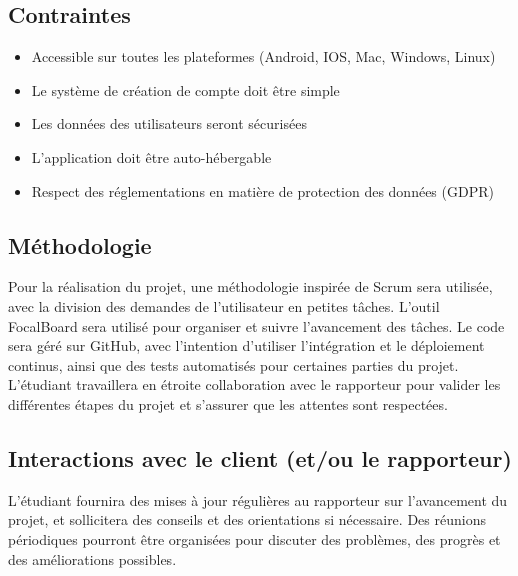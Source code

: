 \subsection{Contraintes}\label{subsec:contraintes}
\begin{itemize}
    \item Accessible sur toutes les plateformes (Android, IOS, Mac, Windows, Linux)
    \item Le système de création de compte doit être simple
    \item Les données des utilisateurs seront sécurisées
    \item L’application doit être auto-hébergable
    \item Respect des réglementations en matière de protection des données (GDPR)
\end{itemize}

\subsection{Méthodologie}\label{subsec:methodologie}
Pour la réalisation du projet, une méthodologie inspirée de Scrum sera utilisée, avec la division des demandes de l'utilisateur en petites tâches.
L'outil FocalBoard sera utilisé pour organiser et suivre l'avancement des tâches.
Le code sera géré sur GitHub, avec l'intention d'utiliser l'intégration et le déploiement continus, ainsi que des tests automatisés pour certaines parties du projet.
L'étudiant travaillera en étroite collaboration avec le rapporteur pour valider les différentes étapes du projet et s'assurer que les attentes sont respectées.

\subsection{Interactions avec le client (et/ou le rapporteur)}\label{subsec:interactions-avec-le-client-(et/ou-le-rapporteur)}
L'étudiant fournira des mises à jour régulières au rapporteur sur l'avancement du projet, et sollicitera des conseils et des orientations si nécessaire.
Des réunions périodiques pourront être organisées pour discuter des problèmes, des progrès et des améliorations possibles.